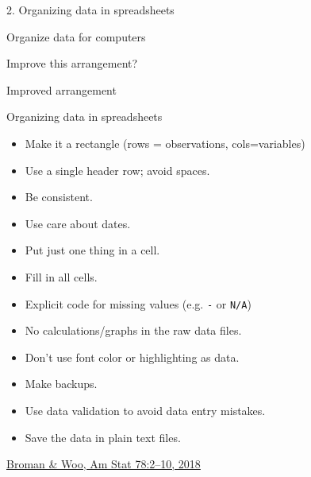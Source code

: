 \documentclass[aspectratio=169,12pt,t]{beamer}
\begin{document}
\begin{frame}[c]{2. Organizing data in spreadsheets}

\begin{center}
\large
Organize data for computers
\end{center}

\end{frame}


\begin{frame}[c]{Improve this arrangement?}


\end{frame}




\begin{frame}[c]{Improved arrangement}


\end{frame}



\begin{frame}[c]{Organizing data in spreadsheets}

  \begin{itemize}
    \footnotesize
  \item Make it a rectangle (rows = observations, cols=variables)
  \item Use a single header row; avoid spaces.
  \item Be consistent.
  \item Use care about dates.
  \item Put just one thing in a cell.
  \item Fill in all cells.
  \item Explicit code for missing values (e.g. {\tt -} or {\tt N/A})
  \item No calculations/graphs in the raw data files.
  \item Don't use font color or highlighting as data.
  \item Make backups.
  \item Use data validation to avoid data entry mistakes.
  \item Save the data in plain text files.
  \end{itemize}


\vspace{7mm}

\hfill
{\footnotesize \lolit
\href{https://doi.org/10.1080/00031305.2017.1375989}{Broman \& Woo,
Am Stat 78:2--10, 2018}
}




\end{frame}
\end{document}
